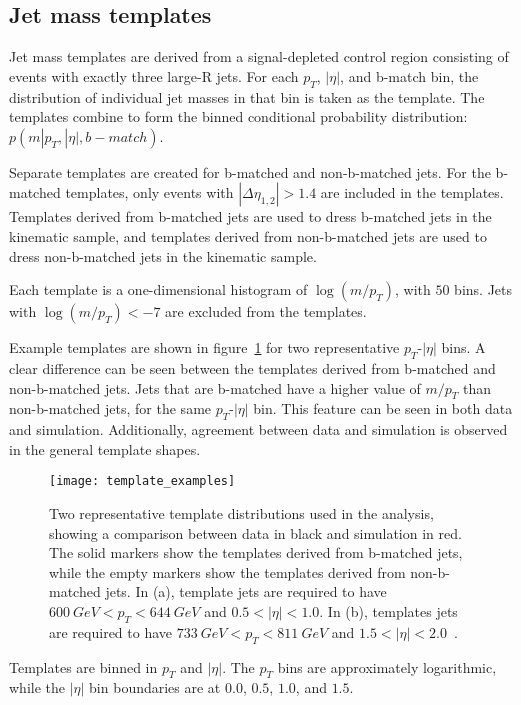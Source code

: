 \subsection{Jet mass templates}\label{subsec:jet_mass_templates}
Jet mass templates are derived from a signal-depleted control region consisting of events with exactly three large-R jets.
For each $p_T$, $|\eta|$, and b-match bin, the distribution of individual jet masses in that bin is taken as the template.
The templates combine to form the binned conditional probability distribution: $p(m|p_{T}, |\eta|, b-match)$.

Separate templates are created for b-matched and non-b-matched jets.
For the b-matched templates, only events with $|\Delta \eta_{1,2}| > 1.4$ are included in the templates.
Templates derived from b-matched jets are used to dress b-matched jets in the kinematic sample,
and templates derived from non-b-matched jets are used to dress non-b-matched jets in the kinematic sample.

Each template is a one-dimensional histogram of $\log\left(m/p_{T}\right)$, with $50$ bins.
Jets with $\log\left(m/p_{T}\right)< -7$ are excluded from the templates.

Example templates are shown in figure~\ref{fig:template_examples} for two representative $p_{T}$-$|\eta|$ bins.
A clear difference can be seen between the templates derived from b-matched and non-b-matched jets.
Jets that are b-matched have a higher value of $m/p_{T}$ than non-b-matched jets, for the same  $p_{T}$-$|\eta|$ bin.
This feature can be seen in both data and simulation.
Additionally, agreement between data and simulation is observed in the general template shapes.

\begin{figure}[!ht]
    \texttt{[image: template\_examples]}
    \caption{Two representative template distributions used in the analysis, showing a comparison between data in black and simulation in red.
    The solid markers show the templates derived from b-matched jets, while the empty markers show the templates derived from non-b-matched jets.
    In (a), template jets are required to have $600~GeV < p_{T} < 644~GeV$ and $0.5 <|\eta|<1.0$.
    In (b), templates jets are required to have $733~GeV < p_{T} < 811~GeV$ and $1.5<|\eta|<2.0$~\cite{paper-plb}.}
    \label{fig:template_examples}
\end{figure}

Templates are binned in $p_T$ and $|\eta|$.
The $p_T$ bins are approximately logarithmic, while the $|\eta|$ bin boundaries are at $0.0$, $0.5$, $1.0$, and $1.5$.

